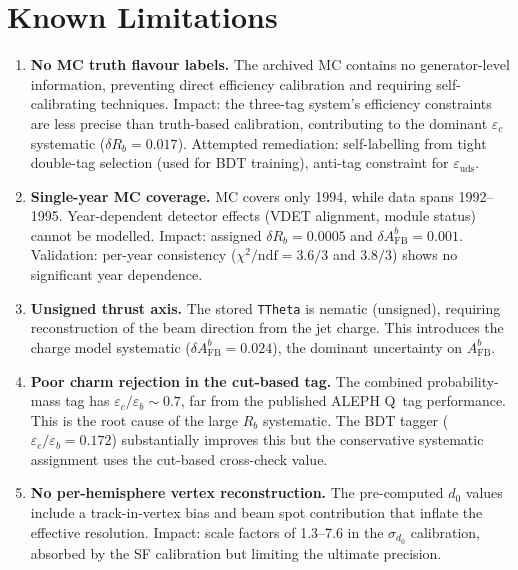 \documentclass[11pt,a4paper]{article}
\begin{document}
\section{Known Limitations}
\label{sec:limitations}

\begin{enumerate}
\item \textbf{No MC truth flavour labels.}
  The archived MC contains no generator-level information, preventing
  direct efficiency calibration and requiring self-calibrating
  techniques.  Impact: the three-tag system's efficiency constraints
  are less precise than truth-based calibration, contributing to
  the dominant $\varepsilon_c$ systematic ($\delta R_b = 0.017$).
  Attempted remediation: self-labelling from tight double-tag selection
  (used for BDT training), anti-tag constraint for $\varepsilon_\mathrm{uds}$.

\item \textbf{Single-year MC coverage.}
  MC covers only 1994, while data spans 1992--1995.  Year-dependent
  detector effects (VDET alignment, module status) cannot be modelled.
  Impact: assigned $\delta R_b = 0.0005$ and $\delta A_\mathrm{FB}^b = 0.001$.
  Validation: per-year consistency ($\chi^2/\mathrm{ndf} = 3.6/3$ and
  $3.8/3$) shows no significant year dependence.

\item \textbf{Unsigned thrust axis.}
  The stored \texttt{TTheta} is nematic (unsigned), requiring
  reconstruction of the beam direction from the jet charge.  This
  introduces the charge model systematic ($\delta A_\mathrm{FB}^b = 0.024$),
  the dominant uncertainty on $A_\mathrm{FB}^b$.

\item \textbf{Poor charm rejection in the cut-based tag.}
  The combined probability-mass tag has $\varepsilon_c/\varepsilon_b \sim 0.7$,
  far from the published ALEPH Q~tag performance.  This is the root cause
  of the large $R_b$ systematic.  The BDT tagger ($\varepsilon_c/\varepsilon_b
  = 0.172$) substantially improves this but the conservative systematic
  assignment uses the cut-based cross-check value.

\item \textbf{No per-hemisphere vertex reconstruction.}
  The pre-computed $d_0$ values include a track-in-vertex bias and
  beam spot contribution that inflate the effective resolution.
  Impact: scale factors of 1.3--7.6 in the $\sigma_{d_0}$ calibration,
  absorbed by the SF calibration but limiting the ultimate precision.
\end{enumerate}
\end{document}
